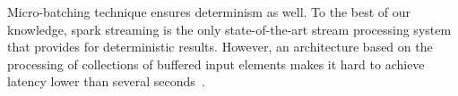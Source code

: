 Micro-batching technique ensures determinism as well. To the best of our knowledge, spark streaming is the only state-of-the-art stream processing system that provides for deterministic results. However, an architecture based on the processing of collections of buffered input elements makes it hard to achieve latency lower than several seconds~\cite{7530084, 7474816}. 



